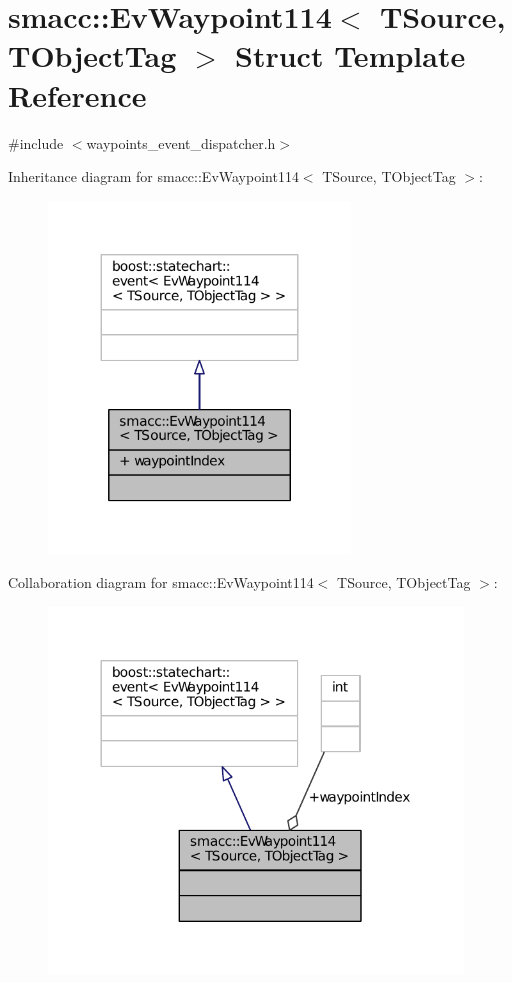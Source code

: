 \hypertarget{structsmacc_1_1EvWaypoint114}{}\section{smacc\+:\+:Ev\+Waypoint114$<$ T\+Source, T\+Object\+Tag $>$ Struct Template Reference}
\label{structsmacc_1_1EvWaypoint114}


{\ttfamily \#include $<$waypoints\+\_\+event\+\_\+dispatcher.\+h$>$}



Inheritance diagram for smacc\+:\+:Ev\+Waypoint114$<$ T\+Source, T\+Object\+Tag $>$\+:
\nopagebreak
\begin{figure}[H]
\begin{center}
\leavevmode
\includegraphics[width=227pt]{structsmacc_1_1EvWaypoint114__inherit__graph}
\end{center}
\end{figure}


Collaboration diagram for smacc\+:\+:Ev\+Waypoint114$<$ T\+Source, T\+Object\+Tag $>$\+:
\nopagebreak
\begin{figure}[H]
\begin{center}
\leavevmode
\includegraphics[width=312pt]{structsmacc_1_1EvWaypoint114__coll__graph}
\end{center}
\end{figure}
